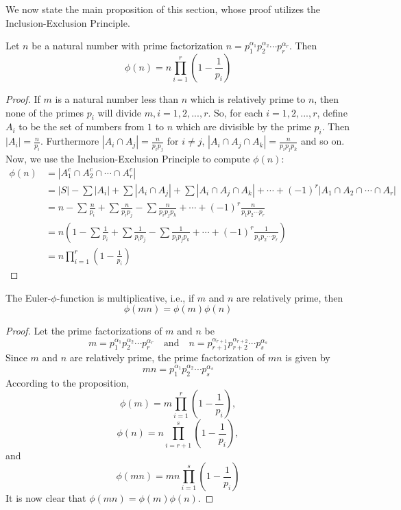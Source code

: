 \documentclass[handout]{ximera}
\begin{document}
We now state the main proposition of this section, whose proof utilizes the Inclusion-Exclusion Principle.





\begin{proposition}
Let $n$ be a natural number with prime factorization
$n = p_1^{\alpha_1}p_2^{\alpha_2} \cdots p_r^{\alpha_r}$.  Then
\[
\phi(n) = n \prod_{i = 1}^r \left(1 - \frac{1}{p_i}\right)
\]
\end{proposition}



\begin{proof}
If $m$ is a natural number less than $n$ which is relatively prime to $n$, 
then none of the primes $p_i$ will divide $m, i = 1, 2, ...,r$.
So, for each $i = 1, 2, ..., r$, define 
$A_i$ to be the set of numbers from $1$ to $n$ which are divisible by the prime $p_i$.
Then $|A_i| = \frac{n}{p_i}$. Furthermore $|A_i \cap A_j| = \frac{n}{p_i p_j}$ for $i \neq j$, 
$|A_i \cap A_j \cap A_k| = \frac{n}{p_i p_jp_k}$ and so on.
Now, we use the Inclusion-Exclusion Principle to compute $\phi(n)$:
\begin{align*}
\phi(n) &= |A_1^c \cap A_2^c \cap \cdots \cap A_r^c|\\
&= |S| - \sum|A_i| + \sum|A_i \cap A_j| + \sum|A_i \cap A_j \cap A_k| + \cdots + (-1)^r|A_1 \cap A_2 \cap \cdots \cap A_r|\\[7pt]
&= n - \sum \frac{n}{p_i} + \sum \frac{n}{p_ip_j} - \sum \frac{n}{p_ip_jp_k} + \cdots + (-1)^r \frac{n}{p_1p_2 \cdots p_r}\\[7pt]
&= n\left(1 - \sum \frac{1}{p_i} + \sum \frac{1}{p_ip_j} - \sum \frac{1}{p_ip_jp_k} + \cdots + (-1)^r \frac{1}{p_1p_2 \cdots p_r} \right)\\[7pt]
&= n \prod_{i = 1}^r \left(1 - \frac{1}{p_i}\right)
\end{align*}
\end{proof}

\begin{corollary}
The Euler-$\phi$-function is multiplicative, i.e., if $m$ and $n$ are relatively prime, then
\[
\phi(mn) = \phi(m)\phi(n)
\]
\end{corollary}
\begin{proof}
Let the prime factorizations of $m$ and $n$ be
\[
m = p_1^{\alpha_1} p_2^{\alpha_2}\cdots p_r^{\alpha_r} \quad \text{and} \quad n = p_{r+1}^{\alpha_{r+1}} p_{r+2}^{\alpha_{r+2}}\cdots p_s^{\alpha_s}
\]
Since $m$ and $n$ are relatively prime, the prime factorization of $mn$ is given by
\[
mn = p_1^{\alpha_1} p_2^{\alpha_2}\cdots p_s^{\alpha_s}
\]
According to the proposition,
\[
\phi(m) = m \prod_{i = 1}^r \left(1 - \frac{1}{p_i}\right),
\]
\[
\phi(n) = n \prod_{i = r+1}^s \left(1 - \frac{1}{p_i}\right),
\]
and
\[
\phi(mn) = mn \prod_{i = 1}^s \left(1 - \frac{1}{p_i}\right)
\]
It is now clear that $\phi(mn) = \phi(m) \phi(n)$.
\end{proof}
\end{document}
